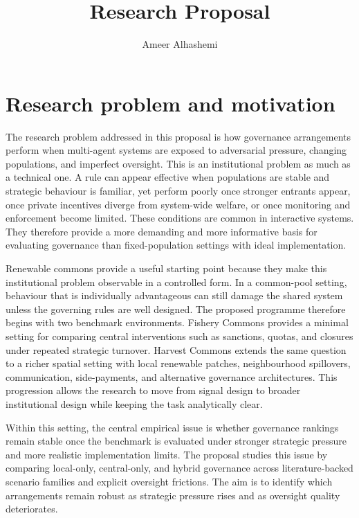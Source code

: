 \documentclass[10pt]{article}
\title{\vspace{-1em}Research Proposal}
\author{Ameer Alhashemi}
\date{}
\begin{document}
\maketitle
\vspace{-2.0em}

\section{Research problem and motivation}

The research problem addressed in this proposal is how governance arrangements perform when multi-agent systems are exposed to adversarial pressure, changing populations, and imperfect oversight. This is an institutional problem as much as a technical one. A rule can appear effective when populations are stable and strategic behaviour is familiar, yet perform poorly once stronger entrants appear, once private incentives diverge from system-wide welfare, or once monitoring and enforcement become limited. These conditions are common in interactive systems. They therefore provide a more demanding and more informative basis for evaluating governance than fixed-population settings with ideal implementation.

Renewable commons provide a useful starting point because they make this institutional problem observable in a controlled form. In a common-pool setting, behaviour that is individually advantageous can still damage the shared system unless the governing rules are well designed. The proposed programme therefore begins with two benchmark environments. Fishery Commons provides a minimal setting for comparing central interventions such as sanctions, quotas, and closures under repeated strategic turnover. Harvest Commons extends the same question to a richer spatial setting with local renewable patches, neighbourhood spillovers, communication, side-payments, and alternative governance architectures. This progression allows the research to move from signal design to broader institutional design while keeping the task analytically clear.

Within this setting, the central empirical issue is whether governance rankings remain stable once the benchmark is evaluated under stronger strategic pressure and more realistic implementation limits. The proposal studies this issue by comparing local-only, central-only, and hybrid governance across literature-backed scenario families and explicit oversight frictions. The aim is to identify which arrangements remain robust as strategic pressure rises and as oversight quality deteriorates.
\end{document}
